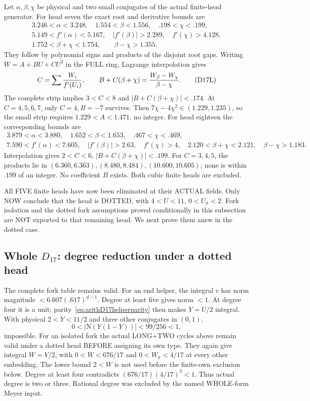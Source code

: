 \documentclass[11pt]{article}
\begin{document}
Let \(\alpha,\beta,\chi\) be physical and two
small conjugates of the actual finite-head generator.
For head seven the exact root and derivative
bounds are
\[
 \begin{gathered}
3.246<\alpha<3.248,\quad1.554<\beta<1.556,\quad
 .198<\chi<.199,\\
5.149<f'(\alpha)<5.167,\quad|f'(\beta)|>2.289,\quad
 f'(\chi)>4.128,\\
1.752<\beta+\chi<1.754,\qquad\beta-\chi>1.355 .
 \end{gathered}
\]
They follow by polynomial signs and products
of the disjoint root gaps.
Writing \(W=A+BU+CU^2\) in the FULL ring,
Lagrange interpolation gives
\[
 C=\sum {W_i\over f'(U_i)},\qquad
 B+C(\beta+\chi)={W_\beta-W_\chi\over\beta-\chi}.
\tag{D17L}\label{eq:arithD17interpolation}
\]
The complete strip implies \(3<C<8\) and
\(|B+C(\beta+\chi)|<.174\).
At \(C=4,5,6,7\), only \(C=4,B=-7\) survives.
Then \(7\chi-4\chi^2\in(1.229,1.235)\),
so the small strip requires \(1.229<A<1.471\),
no integer.
For head eighteen the corresponding bounds are
\[
 \begin{gathered}
3.879<\alpha<3.880,\quad1.652<\beta<1.653,\quad
 .467<\chi<.469,\\
7.590<f'(\alpha)<7.605,\quad|f'(\beta)|>2.63,\quad
 f'(\chi)>4,\quad
2.120<\beta+\chi<2.121,\quad\beta-\chi>1.183 .
 \end{gathered}
\]
Interpolation gives \(2<C<6\),
\(|B+C(\beta+\chi)|<.199\).
For \(C=3,4,5\), the products lie in
\((6.360,6.363),(8.480,8.484),(10.600,10.605)\);
none is within \(.199\) of an integer.
No coefficient \(B\) exists.
Both cubic finite heads are excluded.

All FIVE finite heads have now been eliminated
at their ACTUAL fields.
Only NOW conclude that the head is DOTTED,
with \(4<U<11\), \(0<U_\sigma<2\).
Fork isolation and the dotted fork assumptions
proved conditionally in this subsection are NOT
exported to that remaining head.
We next prove them anew in the dotted case.

\subsection{Whole \(D_{17}\): degree reduction under a dotted head}
\label{app:arithD17degrees}

The complete fork table remains valid.
For an end helper, the integral \(v\) has norm
magnitude \(<6.607(.617)^{d-1}\).
Degree at least five gives norm \(<1\).
At degree four it is a unit;
parity~\eqref{eq:arithD17helperparity} then makes
\(Y=U/2\) integral.
With physical \(2<Y<11/2\) and three other
conjugates in \((0,1)\),
\[
                 0<|\mathrm N(Y(1-Y))|<99/256<1,
\]
impossible.
For an isolated fork the actual LONG+TWO
cycles above remain valid under a dotted head
BEFORE assigning its own type.
They again give integral \(W=V/2\), with
\(0<W<676/17\) and \(0<W_\sigma<4/17\)
at every other embedding.
The lower bound \(2<W\) is not used before
the finite-own exclusion below.
Degree at least four contradicts
\((676/17)(4/17)^3<1\).
Thus actual degree is two or three.
Rational degree was excluded by the named
WHOLE-form Meyer input.
\end{document}
